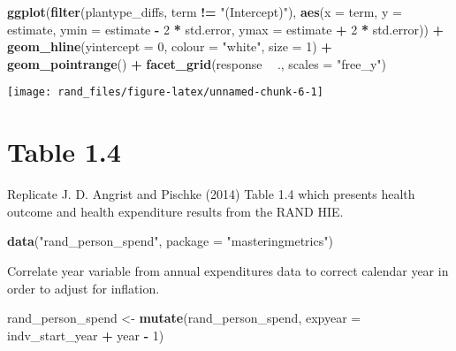 \documentclass[]{book}
\newenvironment{Shaded}{\begin{snugshade}}{\end{snugshade}}
\newcommand{\KeywordTok}[1]{\textcolor[rgb]{0.13,0.29,0.53}{\textbf{#1}}}
\newcommand{\DataTypeTok}[1]{\textcolor[rgb]{0.13,0.29,0.53}{#1}}
\newcommand{\DecValTok}[1]{\textcolor[rgb]{0.00,0.00,0.81}{#1}}
\newcommand{\StringTok}[1]{\textcolor[rgb]{0.31,0.60,0.02}{#1}}
\newcommand{\OperatorTok}[1]{\textcolor[rgb]{0.81,0.36,0.00}{\textbf{#1}}}
\newcommand{\NormalTok}[1]{#1}
\theoremstyle{definition}
\theoremstyle{definition}
\theoremstyle{definition}
\theoremstyle{remark}
\begin{document}
\begin{Shaded}
\begin{Highlighting}[]
\KeywordTok{ggplot}\NormalTok{(}\KeywordTok{filter}\NormalTok{(plantype_diffs, term }\OperatorTok{!=}\StringTok{ "(Intercept)"}\NormalTok{),}
              \KeywordTok{aes}\NormalTok{(}\DataTypeTok{x =}\NormalTok{ term, }\DataTypeTok{y =}\NormalTok{ estimate,}
                  \DataTypeTok{ymin =}\NormalTok{ estimate }\OperatorTok{-}\StringTok{ }\DecValTok{2} \OperatorTok{*}\StringTok{ }\NormalTok{std.error,}
                  \DataTypeTok{ymax =}\NormalTok{ estimate }\OperatorTok{+}\StringTok{ }\DecValTok{2} \OperatorTok{*}\StringTok{ }\NormalTok{std.error)) }\OperatorTok{+}
\StringTok{  }\KeywordTok{geom_hline}\NormalTok{(}\DataTypeTok{yintercept =} \DecValTok{0}\NormalTok{, }\DataTypeTok{colour =} \StringTok{"white"}\NormalTok{, }\DataTypeTok{size =} \DecValTok{1}\NormalTok{) }\OperatorTok{+}
\StringTok{  }\KeywordTok{geom_pointrange}\NormalTok{() }\OperatorTok{+}
\StringTok{  }\KeywordTok{facet_grid}\NormalTok{(response }\OperatorTok{~}\StringTok{ }\NormalTok{., }\DataTypeTok{scales =} \StringTok{"free_y"}\NormalTok{)}
  
\end{Highlighting}
\end{Shaded}

\begin{center}\texttt{[image: rand\_files/figure-latex/unnamed-chunk-6-1]} \end{center}

\section{Table 1.4}\label{table-1.4}

Replicate J. D. Angrist and Pischke (2014) Table 1.4 which presents
health outcome and health expenditure results from the RAND HIE.

\begin{Shaded}
\begin{Highlighting}[]
\KeywordTok{data}\NormalTok{(}\StringTok{"rand_person_spend"}\NormalTok{, }\DataTypeTok{package =} \StringTok{"masteringmetrics"}\NormalTok{)}
\end{Highlighting}
\end{Shaded}

Correlate year variable from annual expenditures data to correct
calendar year in order to adjust for inflation.

\begin{Shaded}
\begin{Highlighting}[]
\NormalTok{rand_person_spend <-}\StringTok{ }\KeywordTok{mutate}\NormalTok{(rand_person_spend,}
                            \DataTypeTok{expyear =}\NormalTok{ indv_start_year }\OperatorTok{+}\StringTok{ }\NormalTok{year }\OperatorTok{-}\StringTok{ }\DecValTok{1}\NormalTok{)}
\end{Highlighting}
\end{Shaded}
\end{document}
